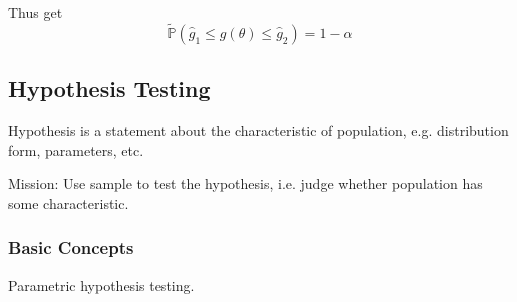     Thus get
    \begin{equation}
        \tilde{\mathbb{P}}(\hat{g}_1\leq g(\theta)\leq \hat{g}_2)=1-\alpha
    \end{equation}







\subsection{Hypothesis Testing}\label{SectionHypothesisTesting}
    Hypothesis is a statement about the characteristic of population, e.g. distribution form, parameters, etc. 
    
    Mission: Use sample to test the hypothesis, i.e. judge whether population has some characteristic.

\subsubsection{Basic Concepts}\label{SubSectionHypothesisTestingBasicConcepts}
    Parametric hypothesis testing.


